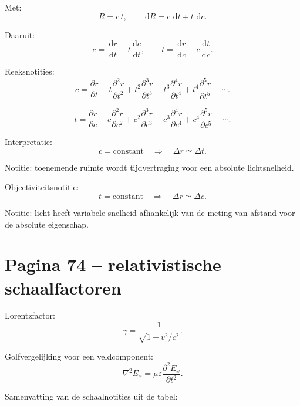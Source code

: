 \documentclass[11pt,a4paper]{article}
\newcommand{\dd}{\,\mathrm{d}}
\begin{document}
Met:
$$
R=c\,t,
\qquad
\dd R=c\,\dd t+t\,\dd c.
$$

Daaruit:
$$
c
=
\frac{\dd r}{\dd t}
-
t\frac{\dd c}{\dd t},
\qquad
t
=
\frac{\dd r}{\dd c}
-
c\frac{\dd t}{\dd c}.
$$

Reeksnotities:
$$
c
=
\frac{\partial r}{\partial t}
-
t\frac{\partial^{2}r}{\partial t^{2}}
+
t^{2}\frac{\partial^{3}r}{\partial t^{3}}
-
t^{3}\frac{\partial^{4}r}{\partial t^{4}}
+
t^{4}\frac{\partial^{5}r}{\partial t^{5}}
-\cdots.
$$

$$
t
=
\frac{\partial r}{\partial c}
-
c\frac{\partial^{2}r}{\partial c^{2}}
+
c^{2}\frac{\partial^{3}r}{\partial c^{3}}
-
c^{3}\frac{\partial^{4}r}{\partial c^{4}}
+
c^{4}\frac{\partial^{5}r}{\partial c^{5}}
-\cdots.
$$

Interpretatie:
$$
c=\mathrm{constant}
\quad\Rightarrow\quad
\Delta r\simeq\Delta t.
$$

Notitie: toenemende ruimte wordt tijdvertraging voor een absolute lichtsnelheid.

Objectiviteitsnotitie:
$$
t=\mathrm{constant}
\quad\Rightarrow\quad
\Delta r\simeq\Delta c.
$$

Notitie: licht heeft variabele snelheid afhankelijk van de meting van afstand voor de absolute eigenschap.

\section*{Pagina 74 -- relativistische schaalfactoren}

Lorentzfactor:
$$
\gamma
=
\frac{1}{\sqrt{1-v^{2}/c^{2}}}.
$$

Golfvergelijking voor een veldcomponent:
$$
\nabla^{2}E_x
=
\mu\varepsilon
\frac{\partial^{2}E_x}{\partial t^{2}}.
$$

Samenvatting van de schaalnotities uit de tabel:
\end{document}
